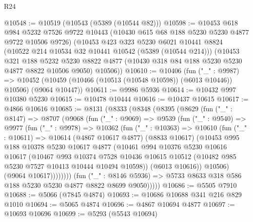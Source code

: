 \begin{lexlean}{R24}
\begin{coremodule}
@10548 := @10519 (@10543 (@5389 (@10544 @82)))
@10598 := @10453
    @618
    @984
    @5232
    @7526
    @9722
    @10443
    (@10430 @615 @68 @188 @5230 @5230 @4877 @9722 @10506 @9726)
    (@10453
      @423
      @323
      @5230
      @6021
      @10441
      @8824
      (@10522 @214 @10534 @32 @10441 @10542 (@5389 (@10544 @214)))
      (@10453
        @321
        @188
        @5232
        @5230
        @8822
        @4877
        (@10430 @318 @84 @188 @5230 @5230 @4877 @8822 @10506 @9050)
        @10506))
@10610 := @10406
    (fun ("_" : @9987) =>
    @10452 (@10459 (@10466 (@10513 (@10548 @10598)) (@6013 @10446)) @10506) (@9064 @10447))
@10611 := @9986 @5936
@10614 := @10432 @997 @10380 @5230
@10615 := @10478 @10444
@10616 := @10437 @10615
@10617 := @4866 @10616
@10685 := @8131
    (@8333
      (@8348
        (@8395
          (@8629
            (fun ("_" : @8147) =>
            @8707
              (@9068
                (fun ("_" : @9069) =>
                @9539
                  (fun ("_" : @9540) =>
                  @9977
                    (fun ("_" : @9978) =>
                    @10362
                      (fun ("_" : @10363) =>
                      @10610
                        (fun ("_" : @10611) =>
                        @10614
                          (@4867 @10617 @4877)
                          (@8833 @10617)
                          (@10453
                            @995
                            @188
                            @10378
                            @5230
                            @10617
                            @4877
                            (@10461
                              @994
                              @10376
                              @5230
                              @10616
                              @10617
                              (@10467
                                @993
                                @10374
                                @7528
                                @10436
                                @10615
                                @10512
                                (@10482 @985 @5230 @7527 @10413 @10444 @10494 @10598))
                              (@6013 @10616))
                            @10506)
                          (@9064 @10617))))))))
            (fun ("_" : @8146 @5936) =>
            @5733 @8633 @318 @586 @188 @5230 @5230 @4877 @8822 @8699 @9050)))))
@10686 := @5505 @7910
@10688 := @5066 (@7845 @4874)
@10693 := @10686 @10688 @341 @216 @829 @1010
@10694 := @5065 @4874
@10696 := @4867 @10694 @4877
@10697 := @10693 @10696
@10699 := @5293 (@5543 @10694)

\end{coremodule}
\end{lexlean}
